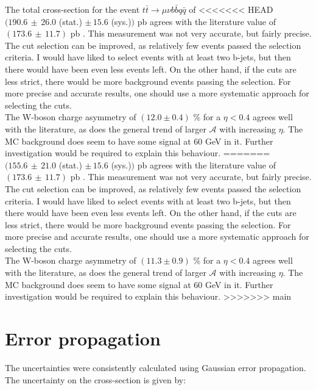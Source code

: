 \documentclass[%
 reprint,
 amsmath,amssymb,
 aps,
]{revtex4-2}
\begin{document}
The total cross-section for the event $t \bar t \rightarrow \mu \nu b \bar b q \bar q$ of 
<<<<<<< HEAD
$(190.6 \, \pm \, 26.0$ (stat.) $\pm \, 15.6$ (sys.)$)$ pb agrees with the literature value of $(173.6 \, \pm \, 11.7)$ pb \cite{workman_review_2022}. This measurement was not very accurate, but fairly precise. The cut selection can be improved, as relatively few events passed the selection criteria. I would have liked to select events with at least two b-jets, but then there would have been even less events left.
On the other hand, if the cuts are less strict, there would be more background events passing the selection. For more precise and accurate results, one should use a more systematic approach for selecting the cuts. \\
The W-boson charge asymmetry of  $(12.0 \pm 0.4)$ \% for a $\eta < 0.4$ agrees well with the literature, as does the general trend of larger $\mathcal{A}$ with increasing $\eta$. The MC background does seem to have some signal at 60 GeV in it. Further investigation would be required to explain this behaviour. 
=======
$(155.6 \, \pm \, 21.0$ (stat.) $\pm \, 15.6$ (sys.)$)$ pb agrees with the literature value of $(173.6 \, \pm \, 11.7)$ pb \cite{workman_review_2022}. This measurement was not very accurate, but fairly precise. The cut selection can be improved, as relatively few events passed the selection criteria. I would have liked to select events with at least two b-jets, but then there would have been even less events left.
On the other hand, if the cuts are less strict, there would be more background events passing the selection. For more precise and accurate results, one should use a more systematic approach for selecting the cuts. \\
The W-boson charge asymmetry of $(11.3 \pm 0.9)$ \% for a $\eta < 0.4$ agrees well with the literature, as does the general trend of larger $\mathcal{A}$ with increasing $\eta$. The MC background does seem to have some signal at 60 GeV in it. Further investigation would be required to explain this behaviour. 
>>>>>>> main








\section{Error propagation}

The uncertainties were consistently calculated using Gaussian error propagation. 
The uncertainty on the cross-section is given by:
\end{document}
